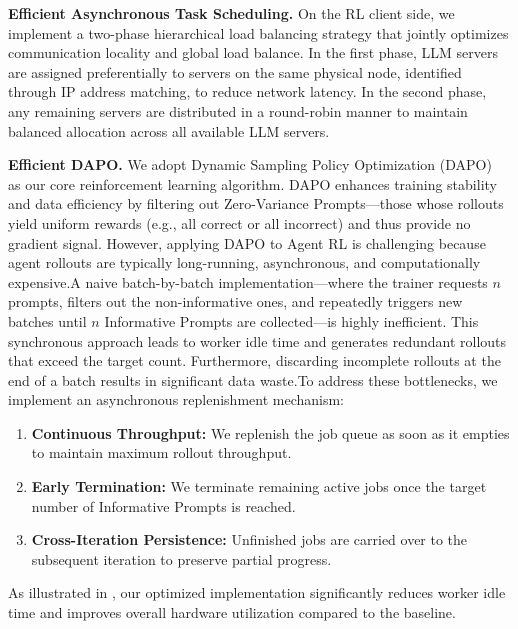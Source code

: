 \textbf{Efficient Asynchronous Task Scheduling.} On the RL client side, we implement a two-phase hierarchical load balancing strategy that jointly optimizes communication locality and global load balance. In the first phase, LLM servers are assigned preferentially to \prorlagent servers on the same physical node, identified through IP address matching, to reduce network latency. In the second phase, any remaining servers are distributed in a round-robin manner to maintain balanced allocation across all available LLM servers.



\textbf{Efficient DAPO.} We adopt Dynamic Sampling Policy Optimization (DAPO)~\citep{yu2025dapoopensourcellmreinforcement} as our core reinforcement learning algorithm. DAPO enhances training stability and data efficiency by filtering out Zero-Variance Prompts—those whose rollouts yield uniform rewards (e.g., all correct or all incorrect) and thus provide no gradient signal. However, applying DAPO to Agent RL is challenging because agent rollouts are typically long-running, asynchronous, and computationally expensive.A naive batch-by-batch implementation—where the trainer requests $n$ prompts, filters out the non-informative ones, and repeatedly triggers new batches until $n$ Informative Prompts are collected—is highly inefficient. This synchronous approach leads to worker idle time and generates redundant rollouts that exceed the target count. Furthermore, discarding incomplete rollouts at the end of a batch results in significant data waste.To address these bottlenecks, we implement an asynchronous replenishment mechanism:
\begin{enumerate}
    \item \textbf{Continuous Throughput:} We replenish the job queue as soon as it empties to maintain maximum rollout throughput.
    \item \textbf{Early Termination:} We terminate remaining active jobs once the target number of Informative Prompts is reached.
    \item \textbf{Cross-Iteration Persistence:} Unfinished jobs are carried over to the subsequent iteration to preserve partial progress.
    
\end{enumerate}
As illustrated in , our optimized implementation significantly reduces worker idle time and improves overall hardware utilization compared to the baseline.  

